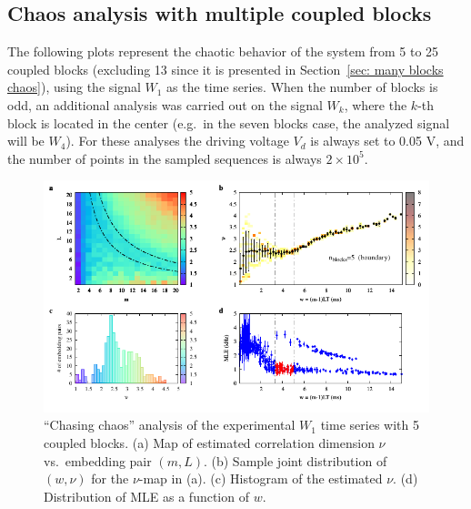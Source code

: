 \begin{appendices}
\chapter{Chaos analysis with multiple coupled blocks}\label{app: multiple blocks}

The following plots represent the chaotic behavior of the system from 5 to 25 coupled blocks
(excluding 13 since it is presented in Section~\ref{sec: many blocks chaos}),
using the signal $W_1$ as the time series.
When the number of blocks is odd, an additional analysis was carried out on the signal $W_k$, where
the $k$-th block is located in the center (e.g.\ in the seven blocks case,
the analyzed signal will be $W_4$).
For these analyses the driving voltage $V_d$ is always set to 0.05 V, and the number of points
in the sampled sequences is always $2\times 10^5$.

\begin{figure}[!htbp]
    \centering
    \includegraphics[width=\linewidth]{../blocks/5_blocks/edge/2e5_points/plots/chaos_low.pdf}
    \caption{``Chasing chaos'' analysis of the experimental $W_1$ time series with 5 coupled blocks.
    (a) Map of estimated correlation dimension $\nu$ vs.\ embedding pair $(m, L)$.
    (b) Sample joint distribution of $(w,\nu)$ for the $\nu$-map in (a).
    (c) Histogram of the estimated $\nu$. (d) Distribution of MLE as a function of $w$.
    } 
\end{figure}


\end{appendices}
